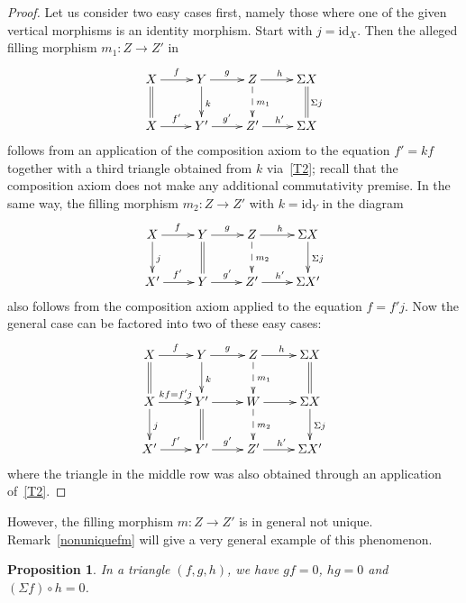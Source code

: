 \documentclass{amsproc}
\newtheorem{prop}{Proposition}[section]
\theoremstyle{definition}
\begin{document}
\begin{proof}
Let us consider two easy cases first, namely those where one of the given vertical morphisms is an identity morphism. Start with $j={\mathrm{id}}_X$. Then the alleged filling morphism $m_1:Z{\longrightarrow} Z'$ in
\begin{displaymath}
\xymatrix{X\ar[r]^f\ar@{=}[d] & Y\ar[r]^g\ar[d]^k & Z\ar[r]^h\ar@{-->}[d]^{m_1} & {}\Sigma X\ar@{=}[d]^{\Sigma j}\\
X\ar[r]^{f'} & Y'\ar[r]^{g'} & Z'\ar[r]^{h'} & {}\Sigma X}
\end{displaymath}
follows from an application of the composition axiom to the equation $f'=kf$ together with a third triangle obtained from $k$ via~\ref{T2}; recall that the composition axiom does not make any additional commutativity premise. In the same way, the filling morphism $m_2:Z{\longrightarrow} Z'$ with $k={\mathrm{id}}_Y$ in the diagram
\begin{displaymath}
\xymatrix{X\ar[r]^f\ar[d]^j & Y\ar[r]^g\ar@{=}[d] & Z\ar[r]^h\ar@{-->}[d]^{m_2} & {}\Sigma X\ar[d]^{\Sigma j}\\
X'\ar[r]^{f'} & Y\ar[r]^{g'} & Z'\ar[r]^{h'} & {}\Sigma X'}
\end{displaymath}
also follows from the composition axiom applied to the equation $f=f'j$. Now the general case can be factored into two of these easy cases:
\begin{displaymath}
\xymatrix{X\ar[r]^f\ar@{=}[d] & Y\ar[r]^g\ar[d]^k & Z\ar[r]^h\ar@{-->}[d]^{m_1} & {}\Sigma X\ar@{=}[d]\\
X\ar[r]^{kf=f'j}\ar[d]^j & Y'\ar[r]\ar@{=}[d] & W\ar[r]\ar@{-->}[d]^{m_2} & {}\Sigma X\ar[d]^{\Sigma j}\\
X'\ar[r]^{f'} & Y'\ar[r]^{g'} & Z'\ar[r]^{h'} & {}\Sigma X'}
\end{displaymath}
where the triangle in the middle row was also obtained through an application of~\ref{T2}.
\end{proof}

However, the filling morphism $m:Z{\longrightarrow} Z'$ is in general not unique. Remark~\ref{nonuniquefm} will give a very general example of this phenomenon.

\begin{prop}
\label{vanishcomp}
In a triangle $(f,g,h)$, we have $gf=0$, $hg=0$ and $(\Sigma f)\circ h=0$.
\end{prop}
\end{document}
